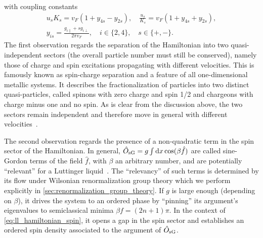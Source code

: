 with coupling constants
\begin{align}
    u_sK_s = v_F(1+y_{4s}-y_{2s}),
    \quad
    \frac{u_s}{K_s} = v_F(1+y_{4s}+y_{2s}),
    \\
    y_{is} = \frac{g_{i\parallel}+sg_{i\perp}}{2\pi v_F},
    \quad
    i\in\{2,4\},
    \quad
    s\in\{+,-\}.
\end{align}
The first observation regards the separation of the Hamiltonian into two quasi-independent sectors (the overall particle number must still be conserved), namely those of charge and spin excitations propagating with different velocities.
This is famously known as spin-charge separation and a feature of all one-dimensional metallic systems.
It describes the fractionalization of particles into two distinct quasi-particles, called spinons with zero charge and spin 1/2 and chargeons with charge minus one and no spin.
As is clear from the discussion above, the two sectors remain independent and therefore move in general with different velocities~\cite{Tomonaga1950,Luttinger1963,Haldane1981,Kim2006}.

The second observation regards the presence of a non-quadratic term in the spin sector of the Hamiltonian.
In general, $\hat O_{\rm sG} = g\int\mathrm d x\cos(\beta\hat f)$
are called sine-Gordon terms of the field $\hat f$, with $\beta$ an arbitrary number, and are potentially ``relevant'' for a Luttinger liquid~\cite{Giamarchi2003,Gogolin2004,AltlandSimons2010}.
The ``relevancy'' of such terms is determined by its flow under Wilsonian renormalization group theory which we perform explicitly in \cref{sec:renormalization_group_theory}.
If $g$ is large enough (depending on $\beta$), it drives the system to an ordered phase by ``pinning'' its argument's eigenvalues to semiclassical minima $\beta f=(2n+1)\pi$.
In the context of \cref{eq:ll_hamiltonian_spin}, it opens a gap in the spin sector and establishes an ordered spin density associated to the argument of $\hat O_{\rm sG}$.
%
%
